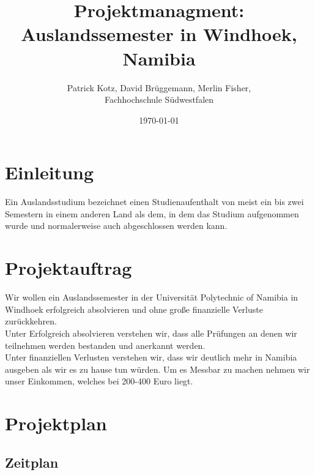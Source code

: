 \documentclass[11pt]{article}
\begin{document}
\begin{titlepage}


\begin{center}
\vspace*{\fill}
  \title{Projektmanagment: \\Auslandssemester in Windhoek, Namibia}
  \author{Patrick Kotz, David Brüggemann, Merlin Fisher,\\ Fachhochschule Südwestfalen}
  \date{\today}
\end{center}

\end{titlepage}


\maketitle

\newpage
\tableofcontents
\newpage

\section{Einleitung}
Ein Auslandsstudium bezeichnet einen Studienaufenthalt von meist ein bis zwei Semestern in einem anderen Land als dem, in dem das Studium aufgenommen wurde und normalerweise auch abgeschlossen werden kann.

\section{Projektauftrag}
Wir wollen ein Auslandssemester in der Universität Polytechnic of Namibia in Windhoek erfolgreich absolvieren und ohne große finanzielle Verluste zurückkehren.\\

Unter Erfolgreich absolvieren verstehen wir, dass alle Prüfungen an denen wir teilnehmen werden bestanden und anerkannt werden.\\

Unter finanziellen Verlusten verstehen wir, dass wir deutlich mehr in Namibia ausgeben als wir es zu hause tun würden. Um es Messbar zu machen nehmen wir unser Einkommen, welches bei 200-400 Euro liegt.


\section{Projektplan}



\subsection{Zeitplan}
\end{document}
